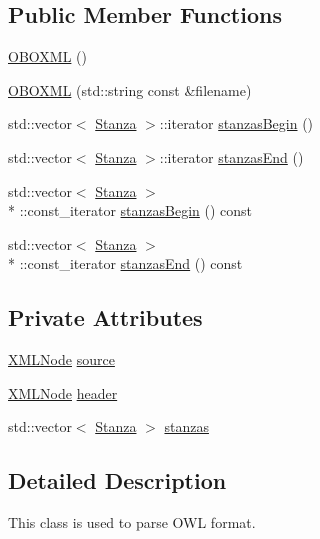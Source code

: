 \subsection*{Public Member Functions}
\begin{DoxyCompactItemize}
\item 
\hyperlink{classunisys_1_1OBOXML_a43c81878a929202fdef45fa31c5ff4de}{O\-B\-O\-X\-M\-L} ()
\item 
\hyperlink{classunisys_1_1OBOXML_a8344c1dd99412d27bdb6e0fcaa78acb5}{O\-B\-O\-X\-M\-L} (std\-::string const \&filename)
\item 
std\-::vector$<$ \hyperlink{classunisys_1_1Stanza}{Stanza} $>$\-::iterator \hyperlink{classunisys_1_1OBOXML_ac084656ba83a65b35ec0a82bcc6e7b0a}{stanzas\-Begin} ()
\item 
std\-::vector$<$ \hyperlink{classunisys_1_1Stanza}{Stanza} $>$\-::iterator \hyperlink{classunisys_1_1OBOXML_abcc90bcb20f33544e70f979c301b4a6c}{stanzas\-End} ()
\item 
std\-::vector$<$ \hyperlink{classunisys_1_1Stanza}{Stanza} $>$\\*
\-::const\-\_\-iterator \hyperlink{classunisys_1_1OBOXML_a084df0afa3deacfa49018f8c671317c4}{stanzas\-Begin} () const 
\item 
std\-::vector$<$ \hyperlink{classunisys_1_1Stanza}{Stanza} $>$\\*
\-::const\-\_\-iterator \hyperlink{classunisys_1_1OBOXML_a798ffdf6c6d1d789906abf482fa9e9c2}{stanzas\-End} () const 
\end{DoxyCompactItemize}
\subsection*{Private Attributes}
\begin{DoxyCompactItemize}
\item 
\hyperlink{structXMLNode}{X\-M\-L\-Node} \hyperlink{classunisys_1_1OBOXML_a14efe4f902a33eabbbc0bdeb1da941b1}{source}
\item 
\hyperlink{structXMLNode}{X\-M\-L\-Node} \hyperlink{classunisys_1_1OBOXML_a964f7b7f3c7056247331a79653abfed1}{header}
\item 
std\-::vector$<$ \hyperlink{classunisys_1_1Stanza}{Stanza} $>$ \hyperlink{classunisys_1_1OBOXML_a0810c630e347064df2b152cc45987f3c}{stanzas}
\end{DoxyCompactItemize}


\subsection{Detailed Description}
This class is used to parse O\-W\-L format. 

